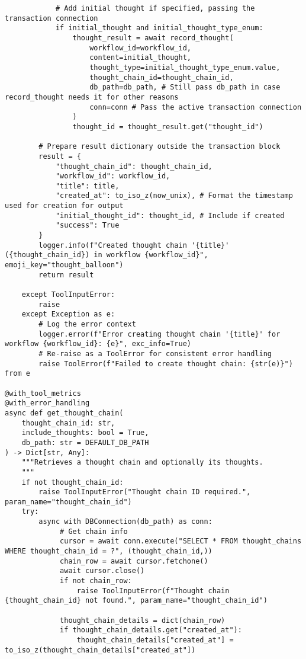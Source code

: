 \documentclass[12pt,a4paper]{article}
\begin{document}
\begin{pageablecode}
\begin{verbatim}
            # Add initial thought if specified, passing the transaction connection
            if initial_thought and initial_thought_type_enum:
                thought_result = await record_thought(
                    workflow_id=workflow_id,
                    content=initial_thought,
                    thought_type=initial_thought_type_enum.value,
                    thought_chain_id=thought_chain_id,
                    db_path=db_path, # Still pass db_path in case record_thought needs it for other reasons
                    conn=conn # Pass the active transaction connection
                )
                thought_id = thought_result.get("thought_id")

        # Prepare result dictionary outside the transaction block
        result = {
            "thought_chain_id": thought_chain_id,
            "workflow_id": workflow_id,
            "title": title,
            "created_at": to_iso_z(now_unix), # Format the timestamp used for creation for output
            "initial_thought_id": thought_id, # Include if created
            "success": True
        }
        logger.info(f"Created thought chain '{title}' ({thought_chain_id}) in workflow {workflow_id}", emoji_key="thought_balloon")
        return result

    except ToolInputError:
        raise
    except Exception as e:
        # Log the error context
        logger.error(f"Error creating thought chain '{title}' for workflow {workflow_id}: {e}", exc_info=True)
        # Re-raise as a ToolError for consistent error handling
        raise ToolError(f"Failed to create thought chain: {str(e)}") from e

@with_tool_metrics
@with_error_handling
async def get_thought_chain(
    thought_chain_id: str,
    include_thoughts: bool = True,
    db_path: str = DEFAULT_DB_PATH
) -> Dict[str, Any]:
    """Retrieves a thought chain and optionally its thoughts.
    """
    if not thought_chain_id:
        raise ToolInputError("Thought chain ID required.", param_name="thought_chain_id")
    try:
        async with DBConnection(db_path) as conn:
             # Get chain info
             cursor = await conn.execute("SELECT * FROM thought_chains WHERE thought_chain_id = ?", (thought_chain_id,))
             chain_row = await cursor.fetchone()
             await cursor.close()
             if not chain_row:
                 raise ToolInputError(f"Thought chain {thought_chain_id} not found.", param_name="thought_chain_id")

             thought_chain_details = dict(chain_row)
             if thought_chain_details.get("created_at"):
                 thought_chain_details["created_at"] = to_iso_z(thought_chain_details["created_at"])


\end{verbatim}
\end{pageablecode}
\end{document}
